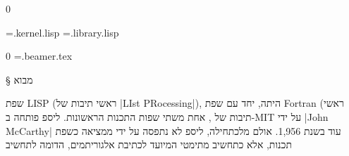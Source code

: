 
\def\CPL{\E|C|\xspace}

\setcounter{library}0

\newread \tempFile %
\newwrite {} %
\newwrite \libraryFile %
\immediate \openout {}=\jobname.kernel.lisp
\immediate \openout \libraryFile=\jobname.library.lisp

\setcounter{beamer}0
\newwrite\beamerfile %
\immediate \openout \beamerfile=\jobname.beamer.tex

\newenvironment{KERNEL}{%
  \stepcounter{kernel}
  \def\fileName{\jobname.kernel.\arabic{kernel}.lisp}%
  \csname filecontents*\endcsname[overwrite]{\fileName}%
}{%
  \csname endfilecontents*\endcsname%
  \LTR
  \endLTR
  \openin \tempFile=\fileName
  \begingroup\endlinechar=-1
  \loop\unless\ifeof \tempFile
    \read\tempFile to\fileline %
    \immediate\write \kernelFile
    {\unexpanded\expandafter{\fileline}}
  \repeat
  \endgroup
  \closein \tempFile
}

\newenvironment{LIBRARY}{%
  \stepcounter{library}
  \def\fileName{\jobname.library.\arabic{library}.lisp}%
  \csname filecontents*\endcsname[overwrite]{\fileName}%
}{%
  \csname endfilecontents*\endcsname%
  \LTR
  \endLTR
  \newread \tempFile %
  \openin \tempFile=\fileName
  \begingroup\endlinechar=-1
  \loop\unless\ifeof \tempFile
    \read\tempFile to\fileline %
    \immediate\write \libraryFile
    {\unexpanded\expandafter{\fileline}} %
  \repeat
  \endgroup
  \closein \tempFile
}

%
§ מבוא

שפת LISP (ראשי תיבות של \E|LIst PRocessing|), היתה, יחד עם שפת Fortran (ראשי
תיבות של , אחת משתי שפות התכנות הראשונות. ליספ פותחה
ב-MIT על ידי \E|John McCarthy| עוד בשנת 1,956. אולם מלכתחילה, ליספ לא נתפסה על
ידי ממציאה כשפת תכנות, אלא כתחשיב מתימטי המיועד לכתיבת אלגוריתמים, הדומה לתחשיב

